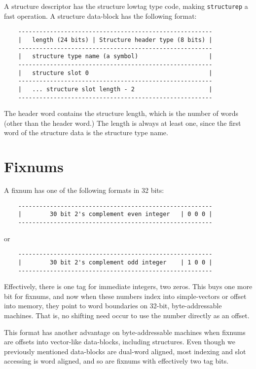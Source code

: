 A structure descriptor has the structure lowtag type code, making 
{\tt structurep} a fast operation.  A structure
data-block has the following format:
\begin{verbatim}
    -------------------------------------------------------
    |   length (24 bits) | Structure header type (8 bits) |
    -------------------------------------------------------
    |   structure type name (a symbol)                    |
    -------------------------------------------------------
    |   structure slot 0                                  |
    -------------------------------------------------------
    |   ... structure slot length - 2                     |
    -------------------------------------------------------
\end{verbatim}

The header word contains the structure length, which is the number of words
(other than the header word.)  The length is always at least one, since the
first word of the structure data is the structure type name.


\section{Fixnums}

A fixnum has one of the following formats in 32 bits:
\begin{verbatim}
    -------------------------------------------------------
    |        30 bit 2's complement even integer   | 0 0 0 |
    -------------------------------------------------------
\end{verbatim}
or
\begin{verbatim}
    -------------------------------------------------------
    |        30 bit 2's complement odd integer    | 1 0 0 |
    -------------------------------------------------------
\end{verbatim}

Effectively, there is one tag for immediate integers, two zeros.  This buys one
more bit for fixnums, and now when these numbers index into simple-vectors or
offset into memory, they point to word boundaries on 32-bit, byte-addressable
machines.  That is, no shifting need occur to use the number directly as an
offset.

This format has another advantage on byte-addressable machines when fixnums are
offsets into vector-like data-blocks, including structures.  Even though we
previously mentioned data-blocks are dual-word aligned, most indexing and slot
accessing is word aligned, and so are fixnums with effectively two tag bits.

